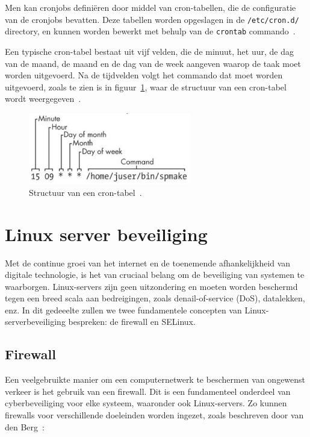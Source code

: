 Men kan cronjobs defini\"eren door middel van cron-tabellen, die de configuratie van de cronjobs bevatten.
Deze tabellen worden opgeslagen in de \texttt{/etc/cron.d/} directory, en kunnen worden bewerkt met behulp van de \texttt{crontab} commando~\autocite{ward2021linux}.

Een typische cron-tabel bestaat uit vijf velden, die de minuut, het uur, de dag van de maand, de maand en de dag van de week aangeven waarop de taak moet worden uitgevoerd.
Na de tijdvelden volgt het commando dat moet worden uitgevoerd, zoals te zien is in figuur~\ref{fig:cronjob-structure}, waar de structuur van een cron-tabel wordt weergegeven~\autocite{ward2021linux}.

\begin{figure}[h!]
    \begin{center}
        \includegraphics[width=200pt]
        {./graphics/linux/cronjob-structure.png}
        \caption[Structuur van een cron-tabel.]{\label{fig:cronjob-structure}Structuur van een cron-tabel~\autocite{ward2021linux}.}
    \end{center}
\end{figure}

\section{Linux server beveiliging}
\label{linux_server_beveiliging}

Met de continue groei van het internet en de toenemende afhankelijkheid van digitale technologie, is het van cruciaal belang om de beveiliging van systemen te waarborgen.
Linux-servers zijn geen uitzondering en moeten worden beschermd tegen een breed scala aan bedreigingen, zoals denail-of-service (DoS), datalekken, enz.
In dit gedeeelte zullen we twee fundamentele concepten van Linux-serverbeveiliging bespreken: de firewall en SELinux.

\subsection{Firewall}
\label{linux_firewall}

Een veelgebruikte manier om een computernetwerk te beschermen van ongewenst verkeer is het gebruik van een firewall.
Dit is een fundamenteel onderdeel van cyberbeveiliging voor elke systeem, waaronder ook Linux-servers.
Zo kunnen firewalls voor verschillende doeleinden worden ingezet, zoals beschreven door van den Berg~\autocite{vandenberg}:

